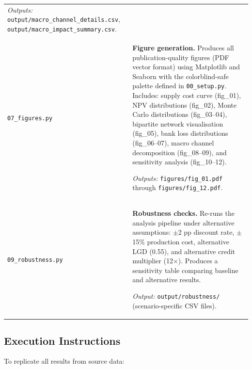 \begin{longtable}{p{4cm}p{9.5cm}}
\textit{Outputs:} \texttt{output/macro\_channel\_details.csv}, \texttt{output/macro\_impact\_summary.csv}. \\[8pt]

\texttt{07\_figures.py} &
\textbf{Figure generation.} Produces all publication-quality figures (PDF vector format) using Matplotlib and Seaborn with the colorblind-safe palette defined in \texttt{00\_setup.py}. Includes: supply cost curve (fig\_01), NPV distributions (fig\_02), Monte Carlo distributions (fig\_03--04), bipartite network visualisation (fig\_05), bank loss distributions (fig\_06--07), macro channel decomposition (fig\_08--09), and sensitivity analysis (fig\_10--12).

\textit{Outputs:} \texttt{figures/fig\_01.pdf} through \texttt{figures/fig\_12.pdf}. \\[8pt]

\texttt{09\_robustness.py} &
\textbf{Robustness checks.} Re-runs the analysis pipeline under alternative assumptions: $\pm$2 pp discount rate, $\pm$15\% production cost, alternative LGD (0.55), and alternative credit multiplier (12$\times$). Produces a sensitivity table comparing baseline and alternative results.

\textit{Output:} \texttt{output/robustness/} (scenario-specific CSV files). \\
\end{longtable}


\subsection{Execution Instructions}
\label{subsec:execution}

To replicate all results from source data:

